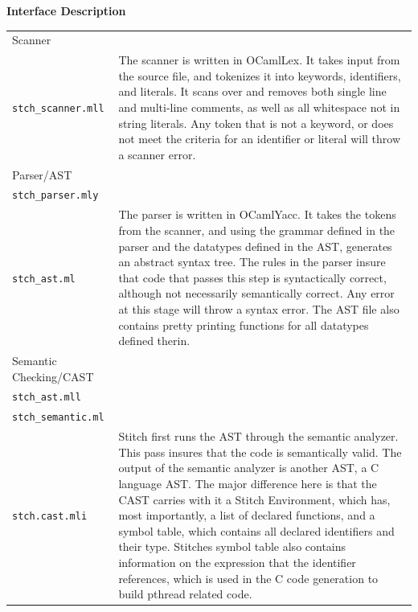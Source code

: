 \documentclass[11pt, oneside]{article}   	%
\begin{document}
\newpage
\Large\textbf{Interface Description}\\[1em]
\normalsize
\begin{tabular}{ l p{12cm} }
Scanner\\\verb|stch_scanner.mll| & The scanner is written in OCamlLex.  It takes input from the source file, and tokenizes it into keywords, identifiers, and literals.  It scans over and removes both single line and multi-line comments, as well as all whitespace not in string literals.  Any token that is not a keyword, or does not meet the criteria for an identifier or literal will throw a scanner error.\\[.5em]
Parser/AST\\ \verb|stch_parser.mly|\\\verb|stch_ast.ml| & The parser is written in OCamlYacc.  It takes the tokens from the scanner, and using the grammar defined in the parser and the datatypes defined in the AST, generates an abstract syntax tree.  The rules in the parser insure that code that passes this step is syntactically correct, although not necessarily semantically correct.  Any error at this stage will throw a syntax error.  The AST file also contains pretty printing functions for all datatypes defined therin.\\[.5em]
Semantic Checking/CAST\\ \verb|stch_ast.mll|\\\verb|stch_semantic.ml|\\\verb|stch.cast.mli| & Stitch first runs the AST through the semantic analyzer.  This pass insures that the code is semantically valid.  The output of the semantic analyzer is another AST, a C language AST.  The major difference here is that the CAST carries with it a Stitch Environment, which has, most importantly, a list of declared functions, and a symbol table, which contains all declared identifiers and their type.  Stitches symbol table also contains information on the expression that the identifier references, which is used in the C code generation to build pthread related code.\\[.5em]
\end{tabular}
\newpage
\end{document}
